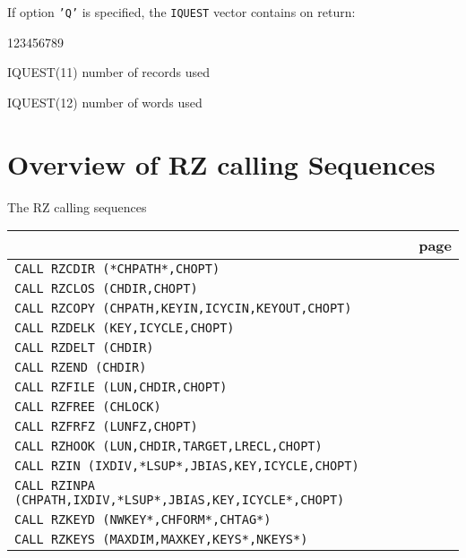 If option {\tt'Q'} is specified, the {\tt IQUEST} vector contains on return:
\begin{DLtt}{123456789}
\item[IQUEST(11)] number of records used
\item[IQUEST(12)] number of words   used
\end{DLtt}
\newpage
{}
\section{Overview of RZ calling Sequences}
\begin{Tabhere}
\caption{The RZ calling sequences}
\label{TRZCALL}
\begin{center}
\begin{tabular}{|>{\tt}l@{\quad}r|}
\hline
\multicolumn{1}{|c}{\bf Calling sequence} & \multicolumn{1}{r|}{\bf page}   \\
\hline
CALL RZCDIR (*CHPATH*,CHOPT)                             & \pageref{RZCDIR} \\
CALL RZCLOS (CHDIR,CHOPT)                                & \pageref{RZCLOS} \\
CALL RZCOPY (CHPATH,KEYIN,ICYCIN,KEYOUT,CHOPT)           & \pageref{RZCOPY} \\
CALL RZDELK (KEY,ICYCLE,CHOPT)                           & \pageref{RZDELK} \\
CALL RZDELT (CHDIR)                                      & \pageref{RZDELT} \\
CALL RZEND (CHDIR)                                       & \pageref{RZEND}  \\
CALL RZFILE (LUN,CHDIR,CHOPT)                            & \pageref{RZFILE} \\
CALL RZFREE (CHLOCK)                                     & \pageref{RZFREE} \\
CALL RZFRFZ (LUNFZ,CHOPT)                                & \pageref{RZFRFZ} \\
CALL RZHOOK (LUN,CHDIR,TARGET,LRECL,CHOPT)               & \pageref{RZHOOK} \\
CALL RZIN (IXDIV,*LSUP*,JBIAS,KEY,ICYCLE,CHOPT)          & \pageref{RZIN}   \\
CALL RZINPA (CHPATH,IXDIV,*LSUP*,JBIAS,KEY,ICYCLE*,CHOPT)& \pageref{RZINPA} \\
CALL RZKEYD (NWKEY*,CHFORM*,CHTAG*)                      & \pageref{RZKEYD} \\
CALL RZKEYS (MAXDIM,MAXKEY,KEYS*,NKEYS*)                 & \pageref{RZKEYS} \\

\end{tabular}
\end{center}
\end{Tabhere}
